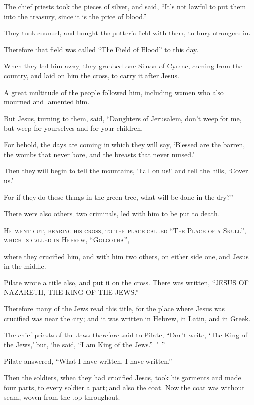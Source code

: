 The chief priests took the pieces of silver, and said, “It’s not lawful to put them into the treasury, since it is the price of blood.”

They took counsel, and bought the potter’s field with them, to bury strangers in.

Therefore that field was called “The Field of Blood” to this day.

When they led him away, they grabbed one Simon of Cyrene, coming from the country, and laid on him the cross, to carry it after Jesus.

A great multitude of the people followed him, including women who also mourned and lamented him.

But Jesus, turning to them, said, “Daughters of Jerusalem, don’t weep for me, but weep for yourselves and for your children.

For behold, the days are coming in which they will say, ‘Blessed are the barren, the wombs that never bore, and the breasts that never nursed.’

Then they will begin to tell the mountains, ‘Fall on us!’ and tell the hills, ‘Cover us.’

For if they do these things in the green tree, what will be done in the dry?”

There were also others, two criminals, led with him to be put to death.




\lettrine{H}{e went out, bearing his cross, to the place called “The Place of a Skull”, which is called in Hebrew, “Golgotha”,}

where they crucified him, and with him two others, on either side one, and Jesus in the middle.

Pilate wrote a title also, and put it on the cross. There was written, “JESUS OF NAZARETH, THE KING OF THE JEWS.”

Therefore many of the Jews read this title, for the place where Jesus was crucified was near the city; and it was written in Hebrew, in Latin, and in Greek.

The chief priests of the Jews therefore said to Pilate, “Don’t write, ‘The King of the Jews,’ but, ‘he said, “I am King of the Jews.” ’ ”

Pilate answered, “What I have written, I have written.”

Then the soldiers, when they had crucified Jesus, took his garments and made four parts, to every soldier a part; and also the coat. Now the coat was without seam, woven from the top throughout.

